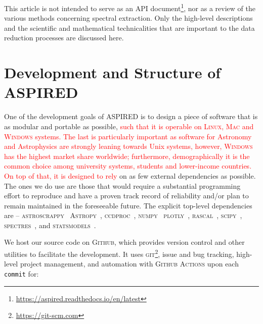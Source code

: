 \documentclass[linenumbers, twocolumn]{aastex631}
\begin{document}
This article is not intended to serve as an API document\footnote{\url{https://aspired.readthedocs.io/en/latest}\label{rtd}}, nor as a review of the
various methods concerning spectral extraction. Only the high-level
descriptions and the scientific and mathematical technicalities that are
important to the data reduction processes are discussed here.

\section{Development and Structure of \textsc{ASPIRED}}
\label{sec:development}

One of the development goals of \textsc{ASPIRED} is to design a piece of
software that is as modular and portable as possible, \textcolor{red}{such that
it is operable on \textsc{Linux}, \textsc{Mac} and \textsc{Windows} systems. The
last is particularly important as software for Astronomy and Astrophysics are
strongly leaning towards Unix systems, however, \textsc{Windows} has the highest
market share worldwide; furthermore, demographically it is the common choice
among university systems, students and lower-income countries. On top of that,
it is designed to rely} on as few external dependencies as possible.
The ones we do use are those that would require a substantial programming effort to reproduce and have a
proven track record of reliability and/or plan to remain maintained in the
foreseeable future. The explicit top-level dependencies are --
\textsc{astroscrappy}~\citep{curtis_mccully_2018_1482019, 2001PASP..113.1420V}
\textsc{Astropy}~\citep{astropy:2013, astropy:2018},
\textsc{ccdproc}~\citep{matt_craig_2017_1069648},
\textsc{numpy}~\citep{2020NumPy-Array}
\textsc{plotly}~\citep{plotly},
\textsc{rascal}~\citep{2020ASPC..527..627V},
\textsc{scipy}~\citep{2020SciPy-NMeth},
\textsc{spectres}~\citep{2017arXiv170505165C}, and
\textsc{statsmodels}~\citep{seabold2010statsmodels}. 

We host our source code on \textsc{Github}, which provides version control and other
utilities to facilitate the development. It uses \textsc{git}\footnote{\url{https://git-scm.com}},
issue and bug tracking, high-level project management, and automation with \textsc{Github Actions}
upon each \texttt{commit} for:
\end{document}

